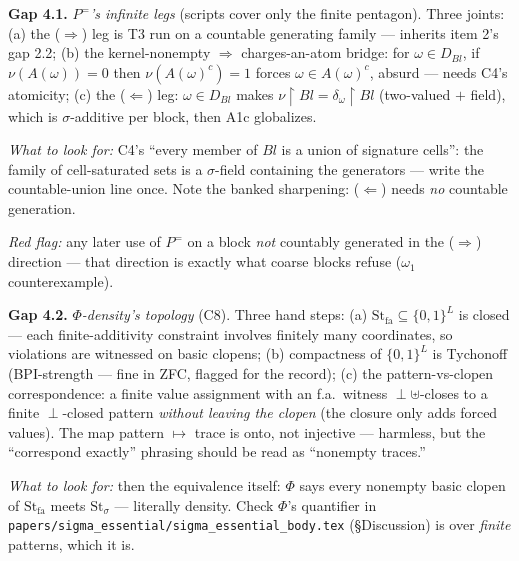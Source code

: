 \documentclass[11pt]{article}
\newcommand{\Stfa}{\mathrm{St}_{\mathrm{fa}}}
\newcommand{\Stsig}{\mathrm{St}_{\sigma}}
\newcommand{\file}[1]{\texttt{\small #1}}
\newcommand{\gap}[1]{\medskip\noindent\textbf{Gap #1.}}
\newcommand{\lookfor}{\par\smallskip\noindent\emph{What to look for:} }
\newcommand{\redflag}{\par\smallskip\noindent\emph{Red flag:} }
\begin{document}
\gap{4.1} \emph{$P^=$'s infinite legs} (scripts cover only the finite
pentagon). Three joints: (a) the ($\Rightarrow$) leg is T3 run on a
countable generating family --- inherits item 2's gap 2.2; (b) the
kernel-nonempty $\Rightarrow$ charges-an-atom bridge: for $\omega \in
D_{Bl}$, if $\nu(A(\omega)) = 0$ then $\nu(A(\omega)^c) = 1$ forces
$\omega \in A(\omega)^c$, absurd --- needs C4's atomicity; (c) the
($\Leftarrow$) leg: $\omega \in D_{Bl}$ makes
$\nu\!\restriction\!Bl = \delta_\omega\!\restriction\!Bl$ (two-valued
$+$ field), which is $\sigma$-additive per block, then A1c globalizes.
\lookfor C4's ``every member of $Bl$ is a union of signature cells'':
the family of cell-saturated sets is a $\sigma$-field containing the
generators --- write the countable-union line once. Note the banked
sharpening: ($\Leftarrow$) needs \emph{no} countable generation.
\redflag any later use of $P^=$ on a block \emph{not} countably
generated in the ($\Rightarrow$) direction --- that direction is
exactly what coarse blocks refuse ($\omega_1$ counterexample).

\gap{4.2} \emph{$\Phi$-density's topology} (C8). Three hand steps:
(a) $\Stfa \subseteq \{0,1\}^L$ is closed --- each finite-additivity
constraint involves finitely many coordinates, so violations are
witnessed on basic clopens; (b) compactness of $\{0,1\}^L$ is
Tychonoff (BPI-strength --- fine in ZFC, flagged for the record);
(c) the pattern-vs-clopen correspondence: a finite value assignment
with an f.a.\ witness $\perp\uplus$-closes to a finite
$\perp$-closed pattern \emph{without leaving the clopen} (the closure
only adds forced values). The map pattern $\mapsto$ trace is onto,
not injective --- harmless, but the ``correspond exactly'' phrasing
should be read as ``nonempty traces.''
\lookfor then the equivalence itself: $\Phi$ says every nonempty
basic clopen of $\Stfa$ meets $\Stsig$ --- literally density. Check
$\Phi$'s quantifier in \file{papers/sigma\_essential/sigma\_essential\_body.tex}
(\S Discussion) is over \emph{finite} patterns, which it is.
\end{document}
